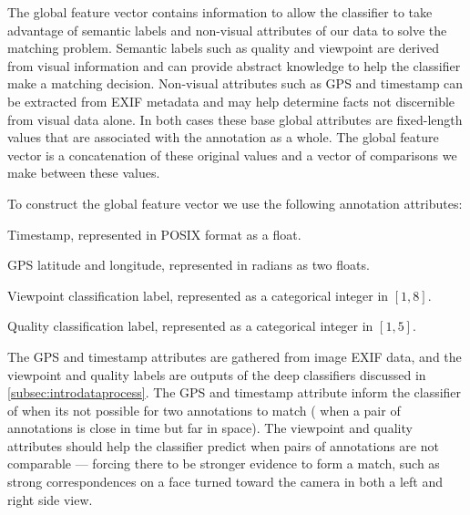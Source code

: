 The global feature vector contains information to allow the classifier to take
  advantage of semantic labels and non-visual attributes of our data to solve
  the matching problem.
Semantic labels such as quality and viewpoint are derived from visual
  information and can provide abstract knowledge to help the classifier make a
  matching decision.
Non-visual attributes such as GPS and timestamp can be extracted from EXIF
  metadata and may help determine facts not discernible from visual data alone.
In both cases these base global attributes are fixed-length values that are
  associated with the annotation as a whole.
The global feature vector is a concatenation of these original values and a
  vector of comparisons we make between these values.

\newcommand{\nan}{\text{NaN}}

To construct the global feature vector we use the following annotation attributes:
\begin{enumln}

    \item Timestamp, represented in POSIX format as a float.

    \item GPS latitude and longitude, represented in radians as two floats. 

    \item Viewpoint classification label, represented as a categorical integer in $[1,8]$.

    \item Quality classification label, represented as a categorical integer
      in $[1,5]$.
\end{enumln}
The GPS and timestamp attributes are gathered from image EXIF data, and the
  viewpoint and quality labels are outputs of the deep classifiers discussed in
  \cref{subsec:introdataprocess}.
The GPS and timestamp attribute inform the classifier of when its not possible
  for two annotations to match (\eg{} when a pair of annotations is close in
  time but far in space).
The viewpoint and quality attributes should help the classifier predict when
  pairs of annotations are not comparable --- forcing there to be stronger
  evidence to form a match, such as strong correspondences on a face turned
  toward the camera in both a left and right side view.



